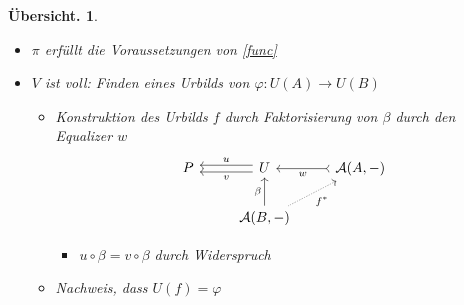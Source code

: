 \documentclass[a4paper, parskip=half]{scrartcl}
\theoremstyle{marginbreak}
\theoremstyle{nonumberplain}
\newtheorem{overview}{Übersicht.}
\newcommand\cat\mathcal
\newcommand{\n}{\pgfmatrixnextcell}
\begin{document}
{\begin{overview}
\begin{itemize}[noitemsep]
\begin{itemize}[noitemsep]
\begin{gather*}
\begin{tikzcd}
								P \n
								U
									\ar[shift right, ']{l}{u}
									\ar[shift left]{l}{v} \n
								\cat{A}(A,{-})
									\ar[tail,']{l}{w}
							\end{tikzcd}
						\end{gather*}
					\end{itemize}
				\item $\pi$ erfüllt die Voraussetzungen von \ref{func}
				\item $V$ ist voll: Finden eines Urbilds von $\varphi\colon U(A)\to U(B)$
					\begin{itemize}[noitemsep]
						\item Konstruktion des Urbilds $f$ durch Faktorisierung von $\beta$ durch den Equalizer $w$
							\[
								\begin{tikzcd}
									P \n
									U
										\ar[shift right,']{l}{u}
										\ar[shift left]{l}{v} \n
									\cat{A}(A,{-})
										\ar[tail]{l}{w} \\ \n
									\cat{A}(B,{-})
										\ar{u}{\beta}
										\ar[densely dotted, ']{ru}{f^*}
								\end{tikzcd}
							\]
							\begin{itemize}[noitemsep]
								\item $u\circ\beta = v\circ\beta$ durch Widerspruch
							\end{itemize}
						\item Nachweis, dass $U(f)=\varphi$
					\end{itemize}
			\end{itemize}
		\end{overview}}
\end{document}

